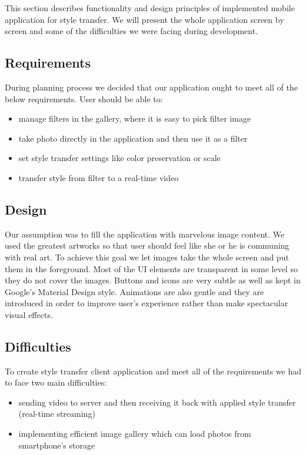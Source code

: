 \documentclass[../Main.tex]{subfiles}
\begin{document}
This section describes functionality and design principles of implemented mobile application for 
style transfer. We will present the whole application screen by screen and some
of the difficulties we were facing during development.

\subsection{Requirements}
During planning process we decided that our application ought to meet all of the 
below requirements.
User should be able to:
\begin{itemize}
    \item manage filters in the gallery, where it is easy to pick filter image
    \item take photo directly in the application and then use it as a filter
    \item set style transfer settings like color preservation or scale
    \item transfer style from filter to a real-time video
\end{itemize}

\subsection{Design}
Our assumption was to fill the application with marvelous image content.
We used the greatest artworks so that user should feel like she or he is communing with real art.
To achieve this goal we let images take the whole screen and put them in the foreground.
Most of the UI elements are transparent in some level so they do not cover the images.
Buttons and icons are very subtle as well as kept in Google's Material Design style.
Animations are also gentle and they are introduced in order to improve user's experience rather than make spectacular visual effects.

\subsection{Difficulties}
To create style transfer client application and meet all of the requirements
we had to face two main difficulties:
\begin{itemize}
    \item sending video to server and then receiving it back with applied style transfer (real-time streaming)
    \item implementing efficient image gallery which can load photos from smartphone's storage
\end{itemize}
\end{document}
